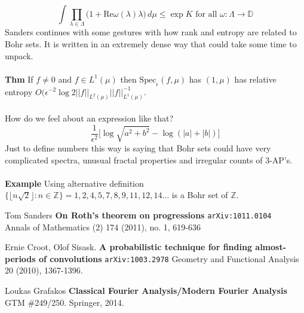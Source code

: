 \documentclass[12pt]{article}
\begin{document}
$$ \int \prod_{\lambda \in \Lambda} \big( 1 + \text{Re}\omega(\lambda) \lambda \big) \, d\mu \leq \exp{K} \text{ for all } \omega: \Lambda \to \mathbb{D}$$ 
Sanders continues with some gestures with how rank and entropy are related to Bohr sets.  It is written in an extremely dense way that could take some time to unpack. \\ \\
\textbf{Thm} If $f \neq 0$ and $f \in L^1(\mu)$ then $\text{Spec}_\epsilon(f, \mu)$ has $(1, \mu)$ has relative entropy $O(\epsilon^{-2} \log 2 ||f||_{L^2(\mu)} ||f||_{L^1(\mu)}^{-1} $. \\ \\
How do we feel about an expression like that?
$$ \frac{1}{\epsilon^2} \Big[\log \sqrt{a^2 + b^2 } - \log(|a| + |b|) \Big] $$
Just to define numbers this way is saying that Bohr sets could have very complicated spectra, unusual fractal properties and irregular counts of 3-AP's. \\ \\
\textbf{Example} Using alternative definition $\{ \lfloor n \sqrt{2} \rfloor : n \in \mathbb{Z}  \} = 1, 2, 4, 5, 7, 8, 9, 11, 12, 14\dots$ is a Bohr set of $\mathbb{Z}$.
\vfill
\begin{thebibliography}{}

\item Tom Sanders \textbf{On Roth's theorem on progressions} \texttt{arXiv:1011.0104} \\
Annals of Mathematics (2) 174 (2011), no. 1, 619-636

\item Ernie Croot, Olof Sisask. \textbf{A probabilistic technique for finding almost-periods of convolutions} \texttt{arXiv:1003.2978} Geometry and Functional Analysis 20 (2010), 1367-1396.


\item Loukas Grafakos 
\textbf{Classical Fourier Analysis/Modern Fourier Analysis} GTM \#249/250. Springer, 2014.

\end{thebibliography}
\end{document}
